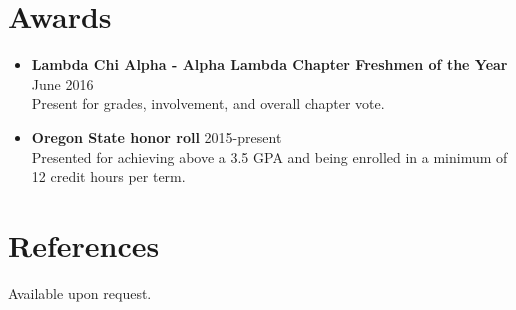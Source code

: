 \documentclass[margin,line]{res}
\begin{document}
\begin{resume}
\begin{itemize}
\end{itemize} 

\section{\sc Awards}
\begin{itemize}
	\item {\bf Lambda Chi Alpha - Alpha Lambda Chapter Freshmen of the Year} \hfill June 2016\\
	Present for grades, involvement, and overall chapter vote.
	
	\item {\bf Oregon State honor roll} \hfill 2015-present\\
	Presented for achieving above a 3.5 GPA and being enrolled in a minimum of 12 credit hours per term. 
\end{itemize}
\section{\sc References }
Available upon request.

\end{resume}
\end{document}
